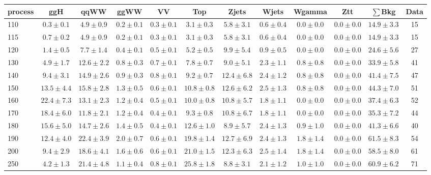 \begin{table}
{%
 \tiny
 \begin{center}
 \begin{tabular}{l c c c c c c c c c c c }
 \hline
 process & ggH & qqWW & ggWW & VV & Top & Zjets & Wjets & Wgamma & Ztt & $\sum$Bkg & Data \\
 \hline
110 & $0.3\pm0.1$ & $4.9\pm0.9$ & $0.2\pm0.1$ & $0.3\pm0.1$ & $3.1\pm0.3$ & $5.8\pm3.1$ & $0.6\pm0.4$ & $0.0\pm0.0$ & $0.0\pm0.0$ & $14.9\pm3.3$ & 15 \\
115 & $0.7\pm0.2$ & $4.9\pm0.9$ & $0.2\pm0.1$ & $0.3\pm0.1$ & $3.1\pm0.3$ & $5.8\pm3.1$ & $0.6\pm0.4$ & $0.0\pm0.0$ & $0.0\pm0.0$ & $14.9\pm3.3$ & 15 \\
120 & $1.4\pm0.5$ & $7.7\pm1.4$ & $0.4\pm0.1$ & $0.5\pm0.1$ & $5.2\pm0.5$ & $9.9\pm5.4$ & $0.9\pm0.5$ & $0.0\pm0.0$ & $0.0\pm0.0$ & $24.6\pm5.6$ & 27 \\
130 & $4.9\pm1.7$ & $12.6\pm2.2$ & $0.8\pm0.3$ & $0.7\pm0.1$ & $7.8\pm0.7$ & $9.0\pm5.1$ & $2.3\pm1.1$ & $0.8\pm0.8$ & $0.0\pm0.0$ & $33.9\pm5.8$ & 41 \\
140 & $9.4\pm3.1$ & $14.9\pm2.6$ & $0.9\pm0.3$ & $0.8\pm0.1$ & $9.2\pm0.7$ & $12.4\pm6.8$ & $2.4\pm1.2$ & $0.8\pm0.8$ & $0.0\pm0.0$ & $41.4\pm7.5$ & 47 \\
150 & $13.5\pm4.4$ & $15.8\pm2.8$ & $1.3\pm0.5$ & $0.6\pm0.1$ & $10.8\pm0.8$ & $12.6\pm6.2$ & $2.5\pm1.3$ & $0.8\pm0.8$ & $0.0\pm0.0$ & $44.3\pm7.0$ & 51 \\
160 & $22.4\pm7.3$ & $13.1\pm2.3$ & $1.2\pm0.4$ & $0.5\pm0.1$ & $10.0\pm0.8$ & $10.8\pm5.7$ & $1.8\pm1.1$ & $0.0\pm0.0$ & $0.0\pm0.0$ & $37.4\pm6.3$ & 52 \\
170 & $18.4\pm6.0$ & $11.8\pm2.1$ & $1.2\pm0.4$ & $0.4\pm0.1$ & $9.3\pm0.8$ & $10.8\pm6.7$ & $1.8\pm1.1$ & $0.0\pm0.0$ & $0.0\pm0.0$ & $35.3\pm7.2$ & 44 \\
180 & $15.6\pm5.0$ & $14.7\pm2.6$ & $1.4\pm0.5$ & $0.4\pm0.1$ & $12.6\pm1.0$ & $8.9\pm5.7$ & $2.4\pm1.3$ & $0.9\pm1.0$ & $0.0\pm0.0$ & $41.3\pm6.6$ & 40 \\
190 & $12.4\pm4.0$ & $22.4\pm3.9$ & $2.0\pm0.7$ & $0.6\pm0.1$ & $19.8\pm1.4$ & $12.7\pm6.9$ & $2.4\pm1.3$ & $1.8\pm1.4$ & $0.0\pm0.0$ & $61.5\pm8.3$ & 54 \\
200 & $9.4\pm2.9$ & $18.6\pm4.1$ & $1.6\pm0.6$ & $0.6\pm0.1$ & $21.0\pm1.5$ & $12.3\pm6.3$ & $2.5\pm1.4$ & $1.8\pm1.4$ & $0.0\pm0.0$ & $58.5\pm8.0$ & 61 \\
250 & $4.2\pm1.3$ & $21.4\pm4.8$ & $1.1\pm0.4$ & $0.8\pm0.1$ & $25.8\pm1.8$ & $8.8\pm3.1$ & $2.1\pm1.2$ & $1.0\pm1.0$ & $0.0\pm0.0$ & $60.9\pm6.2$ & 71 \\

\end{tabular}
\end{center}}
\end{table}
